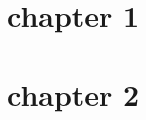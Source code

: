 \documentclass{book}
\begin{document}
\chapter{chapter 1}
\beginnumbering
\numberpstarttrue

\pstart
\lipsum[1]
\pend

\pausenumbering
\begin{pairs}
\begin{Leftside}
\resumenumbering
\numberpstartfalse
	\pstart
	\lipsum[1] 
	\pend
\endnumbering
\end{Leftside}

\begin{Rightside}
\beginnumbering
\numberpstartfalse
	\pstart
	\lipsum[1]
	\pend
\endnumbering
\end{Rightside}
\end{pairs}
\Columns



\chapter{chapter 2}
\beginnumbering
\numberpstarttrue

\pstart
\lipsum[1]
\pend

\pausenumbering
\begin{pairs}
\begin{Leftside}
\resumenumbering
\numberpstartfalse
	\pstart
	\lipsum[1] 
	\pend
\pausenumbering
\end{Leftside}

\begin{Rightside}
\beginnumbering
\numberpstartfalse
	\pstart
	\lipsum[1]
	\pend
\pausenumbering
\end{Rightside}
\end{pairs}
\Columns
\numberpstarttrue
\resumenumbering

\pstart
\lipsum[1]
\pend

\numberpstartfalse
\endnumbering
\end{document}
